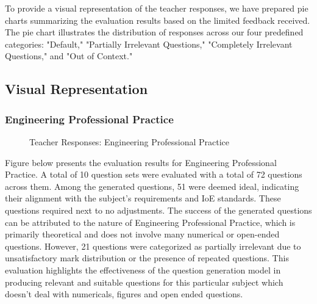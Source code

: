 \documentclass[12pt]{report}
\begin{document}
To provide a visual representation of the teacher responses, we have prepared pie charts summarizing the evaluation results based on the limited feedback received. The pie chart illustrates the distribution of responses across our four predefined categories: "Default," "Partially Irrelevant Questions," "Completely Irrelevant Questions," and "Out of Context."
\subsection{Visual Representation}
\subsubsection{Engineering Professional Practice}
\begin{figure}[!h]
\centering
{}
\caption{Teacher Responses: Engineering Professional Practice}
\label{fig:pie_chart}
\end{figure}
Figure below presents the evaluation results for Engineering Professional Practice. A total of 10 question sets were evaluated with a total of 72 questions across them. Among the generated questions, 51 were deemed ideal, indicating their alignment with the subject's requirements and IoE standards. These questions required next to no adjustments. The success of the generated questions can be attributed to the nature of Engineering Professional Practice, which is primarily theoretical and does not involve many numerical or open-ended questions. However, 21 questions were categorized as partially irrelevant due to unsatisfactory mark distribution or the presence of repeated questions. This evaluation highlights the effectiveness of the question generation model in producing relevant and suitable questions for this particular subject which doesn't deal with numericals, figures and open ended questions.
\pagebreak
\end{document}
